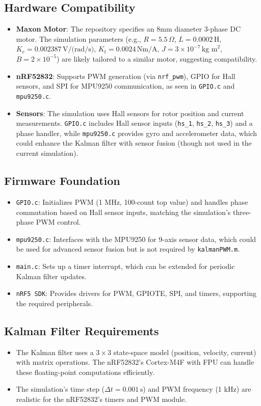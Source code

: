 \documentclass[a4paper,11pt]{article}
\begin{document}
\subsection{Hardware Compatibility}
\begin{itemize}
    \item \textbf{Maxon Motor}: The repository specifies an 8mm diameter 3-phase DC motor. The simulation parameters (e.g., $R = 5.5 \, \Omega$, $L = 0.0002 \, \text{H}$, $K_e = 0.002387 \, \text{V/(rad/s)}$, $K_t = 0.0024 \, \text{Nm/A}$, $J = 3 \times 10^{-7} \, \text{kg m}^2$, $B = 2 \times 10^{-5}$) are likely tailored to a similar motor, suggesting compatibility.
    \item \textbf{nRF52832}: Supports PWM generation (via \texttt{nrf\_pwm}), GPIO for Hall sensors, and SPI for MPU9250 communication, as seen in \texttt{GPIO.c} and \texttt{mpu9250.c}.
    \item \textbf{Sensors}: The simulation uses Hall sensors for rotor position and current measurements. \texttt{GPIO.c} includes Hall sensor inputs (\texttt{hs\_1}, \texttt{hs\_2}, \texttt{hs\_3}) and a phase handler, while \texttt{mpu9250.c} provides gyro and accelerometer data, which could enhance the Kalman filter with sensor fusion (though not used in the current simulation).
\end{itemize}

\subsection{Firmware Foundation}
\begin{itemize}
    \item \texttt{GPIO.c}: Initializes PWM (1 MHz, 100-count top value) and handles phase commutation based on Hall sensor inputs, matching the simulation's three-phase PWM control.
    \item \texttt{mpu9250.c}: Interfaces with the MPU9250 for 9-axis sensor data, which could be used for advanced sensor fusion but is not required by \texttt{kalmanPWM.m}.
    \item \texttt{main.c}: Sets up a timer interrupt, which can be extended for periodic Kalman filter updates.
    \item \texttt{nRF5 SDK}: Provides drivers for PWM, GPIOTE, SPI, and timers, supporting the required peripherals.
\end{itemize}

\subsection{Kalman Filter Requirements}
\begin{itemize}
    \item The Kalman filter uses a $3 \times 3$ state-space model (position, velocity, current) with matrix operations. The nRF52832's Cortex-M4F with FPU can handle these floating-point computations efficiently.
    \item The simulation's time step ($\Delta t = 0.001 \, \text{s}$) and PWM frequency (1 kHz) are realistic for the nRF52832's timers and PWM module.
\end{itemize}
\end{document}
